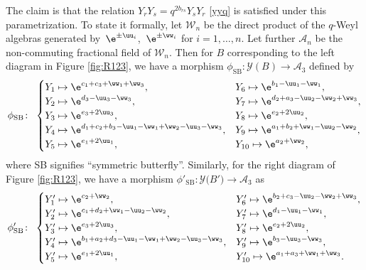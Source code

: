 The claim is that the relation
$Y_r Y_s = q^{2b_{rs}}Y_sY_r$ \eqref{yyq} is satisfied under this parametrization.
%
To state it formally, let $\mathcal{W}_n$ be the direct product of the
$q$-Weyl algebras generated by~$\e^{\pm \uu_i}$,~$\e^{\pm \ww_i}$ for
$i=1, \dots, n$. Let further $\mathcal{A}_n$ be the non-commuting
fractional field of $\mathcal{W}_n$. Then for $B$ corresponding to
the left diagram in Figure \ref{fig:R123}, we have a morphism
$\phi_\mathrm{SB}\colon \mathcal{Y}(B) \rightarrow \mathcal{A}_3$
defined by
\begin{align}
\phi_\mathrm{SB}\colon\
\begin{cases}
Y_1 \mapsto \e^{c_1+c_3+\ww_1+\ww_3},
& Y_6 \mapsto \e^{b_1-\uu_1-\ww_1},
\\
Y_2 \mapsto \e^{d_3-\uu_3-\ww_3},
& Y_7 \mapsto \e^{d_2+a_3-\uu_2-\ww_2+\ww_3},
\\
Y_3 \mapsto \e^{e_3+2\uu_3},
& Y_8 \mapsto \e^{e_2+2\uu_2},
\\
Y_4 \mapsto \e^{d_1+c_2+b_3-\uu_1-\ww_1+\ww_2-\uu_3-\ww_3},
& Y_9 \mapsto \e^{a_1+b_2+\ww_1-\uu_2-\ww_2},
\\
Y_5 \mapsto \e^{e_1+2\uu_1},
& Y_{10} \mapsto \e^{a_2+\ww_2},
\end{cases}
\label{Yw}
\end{align}
where SB signifies ``symmetric butterfly''. Similarly, for the right
diagram of Figure \ref{fig:R123}, we have a morphism
$\phi'_\mathrm{SB}\colon \mathcal{Y}\bigl(B'\bigr) \rightarrow \mathcal{A}_3$ as
\begin{align}
\phi'_\mathrm{SB}\colon\
\begin{cases}
Y'_1 \mapsto \e^{c_2+\ww_2},
& Y'_6 \mapsto \e^{b_2+c_3-\uu_2-\ww_2+\ww_3},
\\
Y'_2 \mapsto \e^{c_1+d_2+\ww_1-\uu_2-\ww_2},
& Y'_7 \mapsto \e^{d_1-\uu_1-\ww_1},
\\
Y'_3 \mapsto \e^{e_3+2\uu_3},
& Y'_8 \mapsto \e^{e_2+2\uu_2},
\\
Y'_4 \mapsto \e^{b_1+a_2+d_3-\uu_1-\ww_1+\ww_2-\uu_3-\ww_3},
& Y'_9 \mapsto \e^{b_3-\uu_3-\ww_3},
\\
Y'_5 \mapsto \e^{e_1+2\uu_1},
& Y'_{10} \mapsto \e^{a_1+a_3+\ww_1+\ww_3}.
\end{cases}
\label{Ypw}
\end{align}
